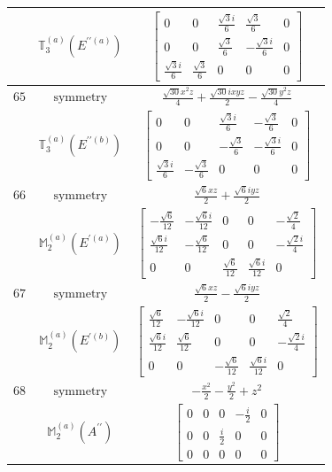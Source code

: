 \documentclass[fleqn,8pt,landscape]{jsarticle}
\begin{document}
\begin{longtable}{ccc}
$  $ & $ \mathbb{T}_{3}^{(a)}(E^{\prime\prime(a)}) $ & $ \begin{bmatrix} 0 & 0 & \frac{\sqrt{3} i}{6} & \frac{\sqrt{3}}{6} & 0 \\ 0 & 0 & \frac{\sqrt{3}}{6} & - \frac{\sqrt{3} i}{6} & 0 \\ \frac{\sqrt{3} i}{6} & \frac{\sqrt{3}}{6} & 0 & 0 & 0 \end{bmatrix} $ \\ \hline
$ 65 $ & $ \text{symmetry} $ & $ \frac{\sqrt{30} x^{2} z}{4} + \frac{\sqrt{30} i x y z}{2} - \frac{\sqrt{30} y^{2} z}{4} $ \\
$  $ & $ \mathbb{T}_{3}^{(a)}(E^{\prime\prime(b)}) $ & $ \begin{bmatrix} 0 & 0 & \frac{\sqrt{3} i}{6} & - \frac{\sqrt{3}}{6} & 0 \\ 0 & 0 & - \frac{\sqrt{3}}{6} & - \frac{\sqrt{3} i}{6} & 0 \\ \frac{\sqrt{3} i}{6} & - \frac{\sqrt{3}}{6} & 0 & 0 & 0 \end{bmatrix} $ \\ \hline
$ 66 $ & $ \text{symmetry} $ & $ \frac{\sqrt{6} x z}{2} + \frac{\sqrt{6} i y z}{2} $ \\
$  $ & $ \mathbb{M}_{2}^{(a)}(E^{\prime(a)}) $ & $ \begin{bmatrix} - \frac{\sqrt{6}}{12} & - \frac{\sqrt{6} i}{12} & 0 & 0 & - \frac{\sqrt{2}}{4} \\ \frac{\sqrt{6} i}{12} & - \frac{\sqrt{6}}{12} & 0 & 0 & - \frac{\sqrt{2} i}{4} \\ 0 & 0 & \frac{\sqrt{6}}{12} & \frac{\sqrt{6} i}{12} & 0 \end{bmatrix} $ \\ \hline
$ 67 $ & $ \text{symmetry} $ & $ \frac{\sqrt{6} x z}{2} - \frac{\sqrt{6} i y z}{2} $ \\
$  $ & $ \mathbb{M}_{2}^{(a)}(E^{\prime(b)}) $ & $ \begin{bmatrix} \frac{\sqrt{6}}{12} & - \frac{\sqrt{6} i}{12} & 0 & 0 & \frac{\sqrt{2}}{4} \\ \frac{\sqrt{6} i}{12} & \frac{\sqrt{6}}{12} & 0 & 0 & - \frac{\sqrt{2} i}{4} \\ 0 & 0 & - \frac{\sqrt{6}}{12} & \frac{\sqrt{6} i}{12} & 0 \end{bmatrix} $ \\ \hline
$ 68 $ & $ \text{symmetry} $ & $ - \frac{x^{2}}{2} - \frac{y^{2}}{2} + z^{2} $ \\
$  $ & $ \mathbb{M}_{2}^{(a)}(A^{\prime\prime}) $ & $ \begin{bmatrix} 0 & 0 & 0 & - \frac{i}{2} & 0 \\ 0 & 0 & \frac{i}{2} & 0 & 0 \\ 0 & 0 & 0 & 0 & 0 \end{bmatrix} $ \\ \hline

\end{longtable}
\end{document}
